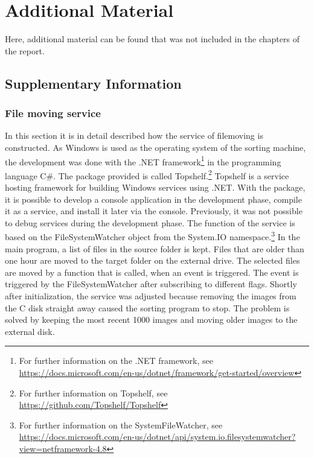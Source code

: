 \section{Additional Material}
\label{apx:AdditionalFigures}

Here, additional material can be found that was not included in the chapters of the report.

\subsection{Supplementary Information}
\label{sec:AddText}

\subsubsection{File moving service}
\label{subsec:FileService}

In this section it is in detail described how the service of filemoving is constructed. As Windows is used as the operating system of the sorting machine, the development was done with the .NET framework\footnote{For further information on the .NET framework, see \url{https://docs.microsoft.com/en-us/dotnet/framework/get-started/overview}} in the programming language C\#. The package provided is called Topshelf.\footnote{For further information on Topshelf, see \url{https://github.com/Topshelf/Topshelf}} Topshelf is a service hosting framework for building Windows services using .NET. With the package, it is possible to develop a console application in the development phase, compile it as a service, and install it later via the console. Previously, it was not possible to debug services during the development phase. The function of the service is based on the FileSystemWatcher object from the System.IO namespace.\footnote{For further information on the SystemFileWatcher, see \url{https://docs.microsoft.com/en-us/dotnet/api/system.io.filesystemwatcher?view=netframework-4.8}} In the main program, a list of files in the source folder is kept. Files that are older than one hour are moved to the target folder on the external drive. The selected files are moved by a function that is called, when an event is triggered. The event is triggered by the FileSystemWatcher after subscribing to different flags. Shortly after initialization, the service was adjusted because removing the images from the C disk straight away caused the sorting program to stop. The problem is solved by keeping the most recent 1000 images and moving older images to the external disk.

